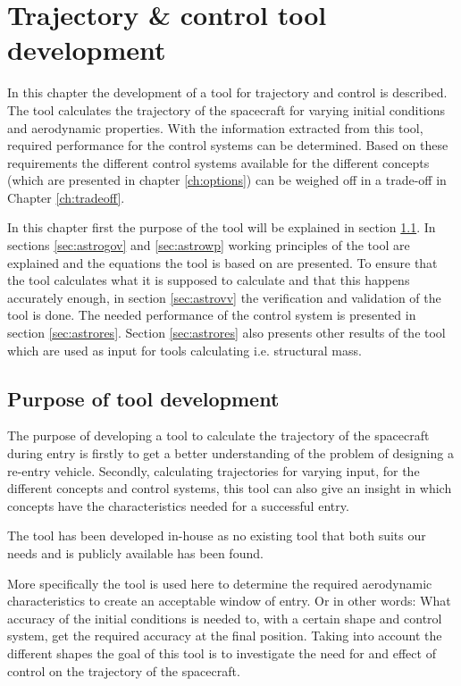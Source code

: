 \section{Trajectory \& control tool development}
\label{ch:astrocontrol}
In this chapter the development of a tool for trajectory and control is described. The tool calculates the trajectory of the spacecraft for varying initial conditions and aerodynamic properties. With the information extracted from this tool, required performance for the control systems can be determined. Based on these requirements the different control systems available for the different concepts (which are presented in chapter \ref{ch:options}) can be weighed off in a trade-off in Chapter \ref{ch:tradeoff}.

In this chapter first the purpose of the tool will be explained in section \ref{sec:astropurpose}. In sections \ref{sec:astrogov} and \ref{sec:astrowp} working principles of the tool are explained and the equations the tool is based on are presented. To ensure that the tool calculates what it is supposed to calculate and that this happens accurately enough, in section \ref{sec:astrovv} the verification and validation of the tool is done. The needed performance of the control system is presented in section \ref{sec:astrores}. Section \ref{sec:astrores} also presents other results of the tool which are used as input for tools calculating i.e. structural mass.

\subsection{Purpose of tool development}
\label{sec:astropurpose}
The purpose of developing a tool to calculate the trajectory of the spacecraft during entry is firstly to get a better understanding of the problem of designing a re-entry vehicle. Secondly, calculating trajectories for varying input, for the different concepts and control systems, this tool can also give an insight in which concepts have the characteristics needed for a successful entry.

The tool has been developed in-house as no existing tool that both suits our needs and is publicly available has been found.

More specifically the tool is used here to determine the required aerodynamic characteristics to create an acceptable window of entry. Or in other words: What accuracy of the initial conditions is needed to, with a certain shape and control system, get the required accuracy at the final position. Taking into account the different shapes the goal of this tool is to investigate the need for and effect of control on the trajectory of the spacecraft.

